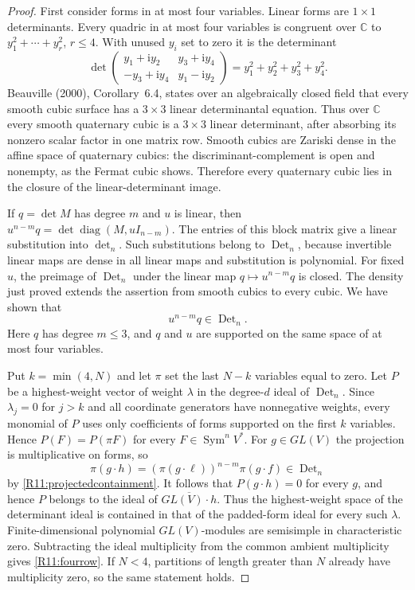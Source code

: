 \begin{proof}
First consider forms in at most four variables. Linear forms are
$1\times1$ determinants. Every quadric in at most four variables
is congruent over $\mathbb C$ to $y_1^2+\cdots+y_r^2$, $r\leq4$.
With unused $y_i$ set to zero it is the determinant
\begin{equation}\label{R11:quadric}
 \det\begin{pmatrix}
 y_1+\mathrm i y_2&y_3+\mathrm i y_4\\
 -y_3+\mathrm i y_4&y_1-\mathrm i y_2
 \end{pmatrix}=
 y_1^2+y_2^2+y_3^2+y_4^2.
\end{equation}
Beauville (2000), Corollary~6.4, states over an algebraically
closed field that every smooth cubic surface has a $3\times3$
linear determinantal equation. Thus over $\mathbb C$ every smooth
quaternary cubic is a $3\times3$ linear determinant, after
absorbing its nonzero scalar factor in one matrix row.
Smooth cubics are Zariski dense in the affine space of quaternary
cubics: the discriminant-complement is open and nonempty, as the
Fermat cubic shows. Therefore every quaternary cubic lies in the
closure of the linear-determinant image.

If $q=\det M$ has degree $m$ and $u$ is linear, then
$u^{n-m}q=\det\operatorname{diag}(M,uI_{n-m})$.
The entries of this block matrix give a linear substitution into
$\det_n$. Such substitutions belong to $\operatorname{Det}_n$,
because invertible linear maps are dense in all linear maps and
substitution is polynomial. For fixed $u$, the preimage of
$\operatorname{Det}_n$ under the linear map $q\mapsto u^{n-m}q$
is closed. The density just proved extends the assertion from
smooth cubics to every cubic. We have shown that
\begin{equation}\label{R11:projectedcontainment}
 u^{n-m}q\in\operatorname{Det}_n.
\end{equation}
Here $q$ has degree $m\leq3$, and $q$ and $u$ are supported
on the same space of at most four variables.

Put $k=\min(4,N)$ and let $\pi$ set the last $N-k$ variables
equal to zero. Let $P$ be a highest-weight vector of weight
$\lambda$ in the degree-$d$ ideal of $\operatorname{Det}_n$.
Since $\lambda_j=0$ for $j>k$ and all coordinate generators have
nonnegative weights, every monomial of $P$ uses only coefficients
of forms supported on the first $k$ variables. Hence
$P(F)=P(\pi F)$ for every $F\in\operatorname{Sym}^nV^*$.
For $g\in GL(V)$ the projection is multiplicative on forms, so
\[
 \pi(g\cdot h)=(\pi(g\cdot\ell))^{n-m}\pi(g\cdot f)
 \in\operatorname{Det}_n
\]
by \eqref{R11:projectedcontainment}. It follows that
$P(g\cdot h)=0$ for every $g$, and hence $P$ belongs to the
ideal of $\overline{GL(V)\cdot h}$.
Thus the highest-weight space of the determinant ideal is
contained in that of the padded-form ideal for every such
$\lambda$. Finite-dimensional polynomial $GL(V)$-modules are
semisimple in characteristic zero. Subtracting the ideal
multiplicity from the common ambient multiplicity gives
\eqref{R11:fourrow}. If $N<4$, partitions of length greater than
$N$ already have multiplicity zero, so the same statement holds.
\end{proof}

